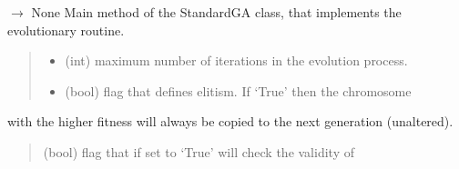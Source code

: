 \documentclass[letterpaper,10pt,english]{sphinxmanual}
\begin{document}
\begin{fulllineitems}
\begin{fulllineitems}
\label{\detokenize{pygenalgo.engines:pygenalgo.engines.standard_ga.StandardGA.run}}
\pysigstartsignatures
\pysiglinewithargsret
{}
{\sphinxparamcomma {}\sphinxparamcomma {}\sphinxparamcomma {}\sphinxparamcomma {}\sphinxparamcomma {}}
{{ $\rightarrow$ None}}
\pysigstopsignatures
\sphinxAtStartPar
Main method of the StandardGA class, that implements the evolutionary routine.
\begin{quote}\begin{description}
\begin{itemize}
\item {} 
\sphinxAtStartPar
{} \textendash{} (int) maximum number of iterations in the evolution process.

\item {} 
\sphinxAtStartPar
{} \textendash{} (bool) flag that defines elitism. If ‘True’ then the chromosome

\end{itemize}

\end{description}\end{quote}

\sphinxAtStartPar
with the higher fitness will always be copied to the next generation (unaltered).
\begin{quote}\begin{description}
\sphinxAtStartPar
{} \textendash{} (bool) flag that if set to ‘True’ will check the validity of


\end{description}
\end{quote}
\end{fulllineitems}
\end{fulllineitems}
\end{document}
